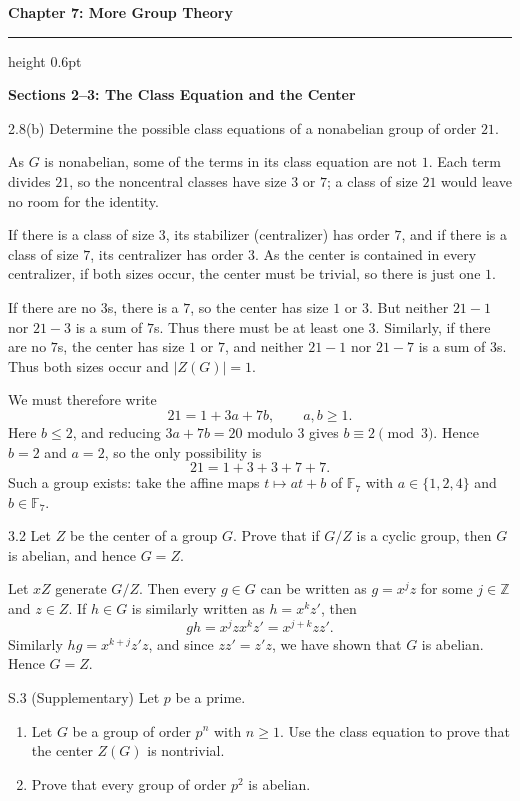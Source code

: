 \documentclass[11pt]{article}
\newcommand{\Z}{\mathbb{Z}}
\newcommand{\F}{\mathbb{F}}
\newcommand{\chapterheading}[1]{%
  \par\Needspace{12\baselineskip}\vspace{0.5em}
  {\color{courseblue}\Large\bfseries #1}\par\vspace{0.35em}
  {\color{boxborder}\hrule height 0.6pt}\vspace{0.35em}
}
\newcommand{\sectionheading}[1]{%
  \Needspace{8\baselineskip}
  \vspace{0.25em}
  {\color{darkgray}\large\bfseries #1}\par
}
\begin{document}
\chapterheading{Chapter 7: More Group Theory}

\sectionheading{Sections 2--3: The Class Equation and the Center}

\begin{exercise}{2.8(b)}
Determine the possible class equations of a nonabelian group of order $21$.
\end{exercise}

\begin{solution}
As $G$ is nonabelian, some of the terms in its class equation are not
$1$. Each term divides $21$, so the noncentral classes have size $3$
or $7$; a class of size $21$ would leave no room for the identity.

If there is a class of size $3$, its stabilizer (centralizer) has order
$7$, and if there is a class of size $7$, its centralizer has order $3$.
As the center is contained in every centralizer, if both sizes occur,
the center must be trivial, so there is just one $1$.

If there are no $3$s, there is a $7$, so the center has size $1$ or $3$.
But neither $21-1$ nor $21-3$ is a sum of $7$s. Thus there must be at
least one $3$. Similarly, if there are no $7$s, the center has size
$1$ or $7$, and neither $21-1$ nor $21-7$ is a sum of $3$s.
Thus both sizes occur and $|Z(G)|=1$.

We must therefore write
\[
  21=1+3a+7b,\qquad a,b\geq1.
\]
Here $b\leq2$, and reducing $3a+7b=20$ modulo $3$ gives
$b\equiv2\pmod3$. Hence $b=2$ and $a=2$, so the only possibility is
\[
  21=1+3+3+7+7.
\]
Such a group exists: take the affine maps $t\mapsto at+b$ of $\F_7$
with $a\in\{1,2,4\}$ and $b\in\F_7$.
\end{solution}

\begin{exercise}{3.2}
Let $Z$ be the center of a group $G$. Prove that if $G/Z$ is a cyclic
group, then $G$ is abelian, and hence $G=Z$.
\end{exercise}

\begin{solution}
Let $xZ$ generate $G/Z$. Then every $g\in G$ can be written as
$g=x^jz$ for some $j\in\Z$ and $z\in Z$. If $h\in G$ is similarly
written as $h=x^kz'$, then
\[
  gh=x^jzx^kz'=x^{j+k}zz'.
\]
Similarly $hg=x^{k+j}z'z$, and since $zz'=z'z$, we have shown that
$G$ is abelian. Hence $G=Z$.
\end{solution}

\begin{exercise}{S.3 (Supplementary)}
Let $p$ be a prime.
\begin{enumerate}[label=\textbf{(\alph*)}]
  \item Let $G$ be a group of order $p^n$ with $n\geq1$. Use the class
        equation to prove that the center $Z(G)$ is nontrivial.
  \item Prove that every group of order $p^2$ is abelian.
\end{enumerate}
\end{exercise}
\end{document}
